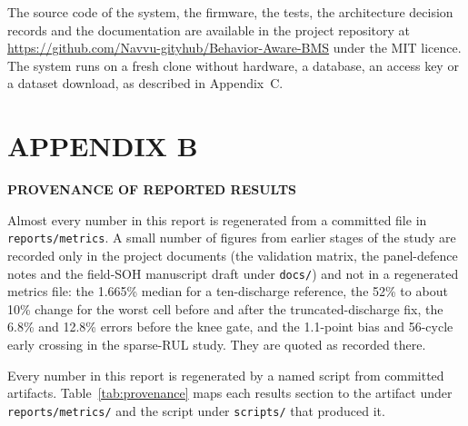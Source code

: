 The source code of the system, the firmware, the tests, the architecture decision records and the documentation are available in the project repository at \url{https://github.com/Navvu-gityhub/Behavior-Aware-BMS} under the MIT licence. The system runs on a fresh clone without hardware, a database, an access key or a dataset download, as described in Appendix~C.

\chapter*{APPENDIX B}

\begin{center}
\textbf{PROVENANCE OF REPORTED RESULTS}
\end{center}

Almost every number in this report is regenerated from a committed file in \texttt{reports/}\allowbreak\texttt{metrics}. A small number of figures from earlier stages of the study are recorded only in the project documents (the validation matrix, the panel-defence notes and the field-SOH manuscript draft under \texttt{docs/}) and not in a regenerated metrics file: the 1.665\% median for a ten-discharge reference, the 52\% to about 10\% change for the worst cell before and after the truncated-discharge fix, the 6.8\% and 12.8\% errors before the knee gate, and the 1.1-point bias and 56-cycle early crossing in the sparse-RUL study. They are quoted as recorded there.


Every number in this report is regenerated by a named script from committed artifacts. Table~\ref{tab:provenance} maps each results section to the artifact under \texttt{reports/metrics/} and the script under \texttt{scripts/} that produced it.

